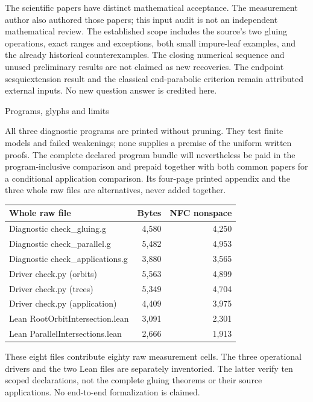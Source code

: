 \documentclass[11pt,a4paper]{article}
\begin{document}
The scientific papers have distinct mathematical acceptance. The measurement author also authored those papers; this input audit is not an independent mathematical review. The established scope includes the source's two gluing operations, exact ranges and exceptions, both small impure-leaf examples, and the already historical counterexamples. The closing numerical sequence and unused preliminary results are not claimed as new recoveries. The endpoint sesquiextension result and the classical end-parabolic criterion remain attributed external inputs. No new question answer is credited here.

\newpage
{\large Programs, glyphs and limits}

All three diagnostic programs are printed without pruning. They test finite models and failed weakenings; none supplies a premise of the uniform written proofs. The complete declared program bundle will nevertheless be paid in the program-inclusive comparison and prepaid together with both common papers for a conditional application comparison. Its four-page printed appendix and the three whole raw files are alternatives, never added together.

\begin{center}\small
\begin{tabular}{lrr}\toprule
Whole raw file & Bytes & NFC nonspace\\\midrule
Diagnostic check\_gluing.g & 4,580 & 4,250 \\
Diagnostic check\_parallel.g & 5,482 & 4,953 \\
Diagnostic check\_applications.g & 3,880 & 3,565 \\
Driver check.py (orbits) & 5,563 & 4,899 \\
Driver check.py (trees) & 5,349 & 4,704 \\
Driver check.py (application) & 4,409 & 3,975 \\
Lean RootOrbitIntersection.lean & 3,091 & 2,301 \\
Lean ParallelIntersections.lean & 2,666 & 1,913 \\
\bottomrule\end{tabular}\end{center}

These eight files contribute eighty raw measurement cells. The three operational drivers and the two Lean files are separately inventoried. The latter verify ten scoped declarations, not the complete gluing theorems or their source applications. No end-to-end formalization is claimed.
\end{document}
